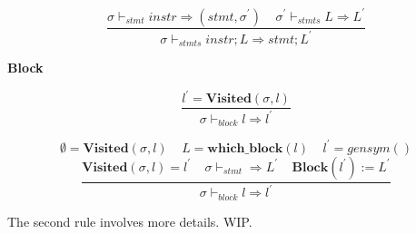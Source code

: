 \documentclass[12pt, a4paper]{report}
\newcommand{\centerfrac}[4]{
    $$ #2 $$
    $$
        \dfrac { #3 } { #4 } #1
    $$
}
\newcommand{\gap}{ \;\;\;\; }
\begin{document}
$$
\dfrac{
    \sigma \vdash_{stmt} \mathit{instr} \Rightarrow (\mathit{stmt}, \sigma^{'})
    \gap
    \sigma^{'} \vdash_{stmts} L \Rightarrow L^{'}
}{
    \sigma \vdash_{stmts} \mathit{instr}; L \Rightarrow \mathit{stmt}; L^{'}
}
$$

\textbf{Block}

$$
\dfrac{
    l^{'} = \mathbf{Visited}(\sigma, l)
}{
    \sigma \vdash_{block} l \Rightarrow l^{'}
}
$$

\centerfrac{}{
    \emptyset = \mathbf{Visited}(\sigma, l)
    \gap
    L = \mathbf{which\_block}(l)
    \gap
    l^{'} = \mathit{gensym}()
}{
    \mathbf{Visited}(\sigma, l) = l^{'}
    \gap
    \sigma \vdash_{stmt} \Rightarrow L^{'}
    \gap
    \mathbf{Block}(l^{'}) := L^{'}
}{
    \sigma \vdash_{block} l \Rightarrow l^{'}
}

The second rule involves more details. WIP.
\end{document}
